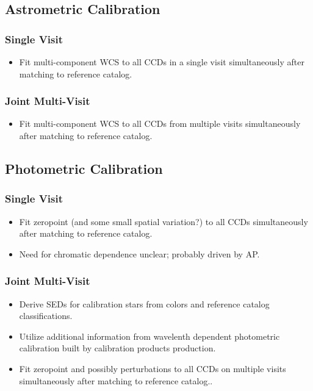 \subsection{Astrometric Calibration}
\subsubsection{Single Visit}
\begin{itemize}
\item Fit multi-component WCS to all CCDs in a single visit simultaneously after matching to reference catalog.
\end{itemize}
\subsubsection{Joint Multi-Visit}
\begin{itemize}
\item Fit multi-component WCS to all CCDs from multiple visits simultaneously after matching to reference catalog.
\end{itemize}

\subsection{Photometric Calibration}
\subsubsection{Single Visit}
\begin{itemize}
\item Fit zeropoint (and some small spatial variation?) to all CCDs simultaneously after matching to reference catalog.
\item Need for chromatic dependence unclear; probably driven by AP.
\end{itemize}
\subsubsection{Joint Multi-Visit}
\begin{itemize}
\item Derive SEDs for calibration stars from colors and reference catalog classifications.
\item Utilize additional information from wavelenth dependent photometric calibration built by calibration products production.
\item Fit zeropoint and possibly perturbations to all CCDs on multiple visits simultaneously after matching to reference catalog..
\end{itemize}

